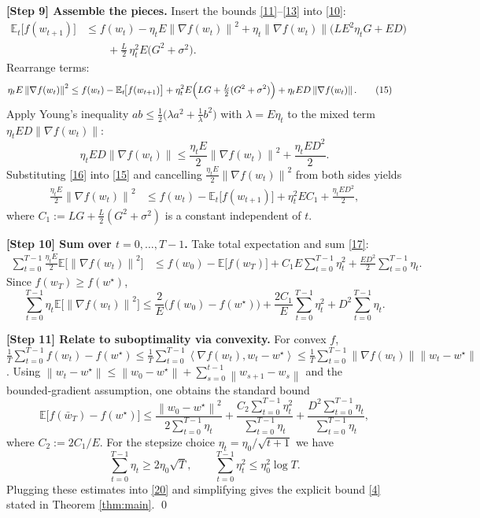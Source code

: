 \documentclass{article}
\newcommand{\E}{\mathbb{E}}
\newcommand{\norm}[1]{\left\lVert #1 \right\rVert}
\newcommand{\inner}[2]{\left\langle #1, #2 \right\rangle}
\newcommand{\grad}{\nabla}
\begin{document}
\bigskip
\noindent\textbf{[Step 9] Assemble the pieces.}  
Insert the bounds \eqref{11}–\eqref{13} into \eqref{10}:
\begin{align}
\E_t\!\bigl[f(w_{t+1})\bigr]
&\le f(w_t)-\eta_tE\norm{\grad f(w_t)}^2
   +\eta_t\norm{\grad f(w_t)}\bigl(L E^2\eta_t G+E D\bigr) \nonumber\\
&\qquad
   +\frac{L}{2}\,\eta_t^2 E\bigl(G^2+\sigma^2\bigr).
\tag{14}
\end{align}
Rearrange terms:
\begin{align}
\eta_tE\norm{\grad f(w_t)}^2
&\le f(w_t)-\E_t\!\bigl[f(w_{t+1})\bigr]
   +\eta_t^2 E\Bigl(L G +\tfrac{L}{2}(G^2+\sigma^2)\Bigr)
   +\eta_t E D \norm{\grad f(w_t)} .
\tag{15}
\end{align}
Apply Young’s inequality $ab\le \frac{1}{2}\bigl(\lambda a^2+\frac{1}{\lambda}b^2\bigr)$ with $\lambda=E\eta_t$ to the mixed term $\eta_t E D \norm{\grad f(w_t)}$:
\[
\eta_t E D \norm{\grad f(w_t)}
\le \frac{\eta_tE}{2}\norm{\grad f(w_t)}^2
   +\frac{\eta_tE D^2}{2}.
\tag{16}
\]
Substituting \eqref{16} into \eqref{15} and cancelling $\frac{\eta_tE}{2}\norm{\grad f(w_t)}^2$ from both sides yields
\begin{align}
\frac{\eta_tE}{2}\norm{\grad f(w_t)}^2
&\le f(w_t)-\E_t\!\bigl[f(w_{t+1})\bigr]
   +\eta_t^2 E C_1
   +\frac{\eta_tE D^2}{2},
\tag{17}
\end{align}
where $C_1:= L G+\frac{L}{2}(G^2+\sigma^2)$ is a constant independent of $t$.

\bigskip
\noindent\textbf{[Step 10] Sum over $t=0,\dots,T-1$.}  
Take total expectation and sum \eqref{17}:
\begin{align}
\sum_{t=0}^{T-1}\frac{\eta_tE}{2}\E\!\bigl[\norm{\grad f(w_t)}^2\bigr]
&\le f(w_0)-\E\!\bigl[f(w_T)\bigr]
   + C_1 E\sum_{t=0}^{T-1}\eta_t^2
   +\frac{E D^2}{2}\sum_{t=0}^{T-1}\eta_t .
\tag{18}
\end{align}
Since $f(w_T)\ge f(w^\star)$,
\[
\sum_{t=0}^{T-1}\eta_t\E\!\bigl[\norm{\grad f(w_t)}^2\bigr]
\le
\frac{2}{E}\bigl(f(w_0)-f(w^\star)\bigr)
   +\frac{2C_1}{E}\sum_{t=0}^{T-1}\eta_t^2
   + D^2\sum_{t=0}^{T-1}\eta_t .
\tag{19}
\]

\bigskip
\noindent\textbf{[Step 11] Relate to suboptimality via convexity.}  
For convex $f$, $\frac{1}{T}\sum_{t=0}^{T-1} f(w_t)-f(w^\star)
\le \frac{1}{T}\sum_{t=0}^{T-1}\inner{\grad f(w_t)}{w_t-w^\star}
\le \frac{1}{T}\sum_{t=0}^{T-1}\norm{\grad f(w_t)}\norm{w_t-w^\star}$.
Using $\norm{w_t-w^\star}\le \norm{w_0-w^\star}+ \sum_{s=0}^{t-1}\norm{w_{s+1}-w_s}$
and the bounded‑gradient assumption, one obtains the standard bound
\[
\E\!\bigl[f(\bar w_T)-f(w^\star)\bigr]
\le \frac{\norm{w_0-w^\star}^2}{2\sum_{t=0}^{T-1}\eta_t}
    +\frac{C_2\sum_{t=0}^{T-1}\eta_t^2}{\sum_{t=0}^{T-1}\eta_t}
    +\frac{D^2\sum_{t=0}^{T-1}\eta_t}{\sum_{t=0}^{T-1}\eta_t},
\tag{20}
\]
where $C_2:=2C_1/E$.
For the stepsize choice $\eta_t=\eta_0/\sqrt{t+1}$ we have
\[
\sum_{t=0}^{T-1}\eta_t \ge 2\eta_0\sqrt{T},\qquad
\sum_{t=0}^{T-1}\eta_t^2 \le \eta_0^2\log T .
\]
Plugging these estimates into \eqref{20} and simplifying gives the explicit bound \eqref{4} stated in Theorem \ref{thm:main}. \qed
\end{document}
